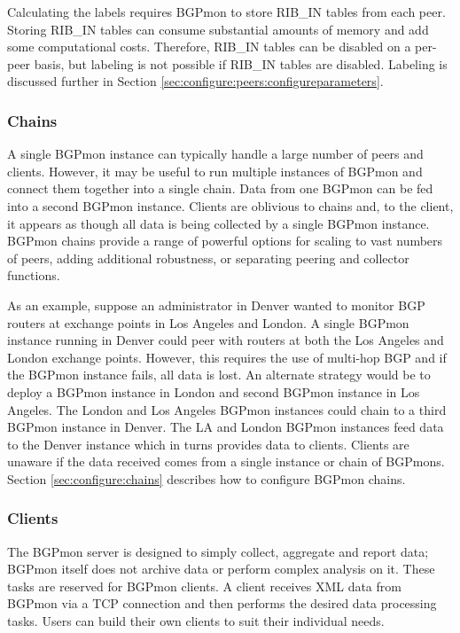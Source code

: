 Calculating the labels requires BGPmon to store RIB\_IN tables from each peer. 
Storing RIB\_IN tables can consume substantial amounts of memory and add some computational costs. 
Therefore, RIB\_IN tables can be disabled on a per-peer basis, but labeling is not possible if RIB\_IN tables are disabled.
Labeling is discussed further in Section \ref{sec:configure:peers:configureparameters}.

\subsubsection{Chains}

A single BGPmon instance can typically handle a large number of peers and clients.
However, it may be useful to run multiple instances of BGPmon and connect them together into a single chain.
Data from one BGPmon can be fed into a second BGPmon instance.
Clients are oblivious to chains and, to the client,  it appears as though all data is being collected by a single BGPmon instance.
BGPmon chains provide a range of powerful options for scaling to vast numbers of peers, adding additional robustness, or separating peering and collector functions.

As an example, suppose an administrator in Denver wanted to monitor BGP routers at exchange points in Los Angeles and London.    A single BGPmon instance running in Denver could peer with routers at both the Los Angeles and London exchange points.   However, this requires the use of multi-hop BGP and if the BGPmon instance fails, all data is lost.    An alternate strategy would be to deploy a BGPmon instance in London and second BGPmon instance in Los Angeles.     The London and Los Angeles BGPmon instances could chain to a third BGPmon instance in Denver.    The LA and London BGPmon instances feed data to the Denver instance which in turns provides data to clients.    Clients are unaware if the data received comes from a single instance or chain of BGPmons.     Section \ref{sec:configure:chains} describes how to configure BGPmon chains. 


\subsubsection{Clients}
The BGPmon server is designed to simply collect, aggregate and report data; BGPmon itself does not archive data or perform complex analysis on it.
These tasks are reserved for BGPmon clients.
A client receives XML data from BGPmon via a TCP connection and then performs the desired data processing tasks.
Users can build their own clients to suit their individual needs.

